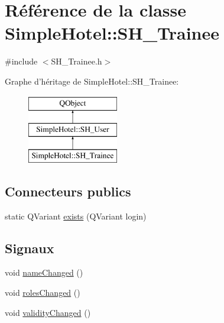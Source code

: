 \hypertarget{classSimpleHotel_1_1SH__Trainee}{\section{Référence de la classe Simple\-Hotel\-:\-:S\-H\-\_\-\-Trainee}
\label{classSimpleHotel_1_1SH__Trainee}
}


{\ttfamily \#include $<$S\-H\-\_\-\-Trainee.\-h$>$}

Graphe d'héritage de Simple\-Hotel\-:\-:S\-H\-\_\-\-Trainee\-:\begin{figure}[H]
\begin{center}
\leavevmode
\includegraphics[height=3.000000cm]{classSimpleHotel_1_1SH__Trainee}
\end{center}
\end{figure}
\subsection*{Connecteurs publics}
\begin{DoxyCompactItemize}
\item 
static Q\-Variant \hyperlink{classSimpleHotel_1_1SH__User_a5b620469cfd767611c8be0cea77842ee}{exists} (Q\-Variant login)
\end{DoxyCompactItemize}
\subsection*{Signaux}
\begin{DoxyCompactItemize}
\item 
void \hyperlink{classSimpleHotel_1_1SH__User_af3b558a0626d2fe726f73b65c27299ce}{name\-Changed} ()
\item 
void \hyperlink{classSimpleHotel_1_1SH__User_a3b8e95cc9b6e660e2b879658f923265a}{roles\-Changed} ()
\item 
void \hyperlink{classSimpleHotel_1_1SH__User_a5355f39889901f52c975292df91728cf}{validity\-Changed} ()
\end{DoxyCompactItemize}
